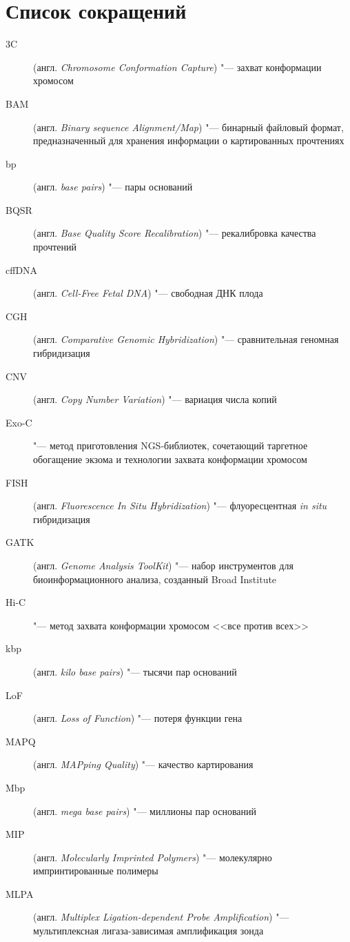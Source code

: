 \documentclass[a4paper,14pt]{extarticle}
\newcommand{\engterm}[1]{англ. \textenglish{\textit{#1}}}
\begin{document}
\tableofcontents
\newpage

\section*{Список сокращений}

\begin{description}
	\item[3C] (\engterm{Chromosome Conformation Capture}) "--- захват конформации хромосом
	\item[BAM] (\engterm{Binary sequence Alignment/Map}) "--- бинарный файловый формат, предназначенный для хранения информации о картированных прочтениях
	\item[bp] (\engterm{base pairs}) "--- пары оснований
	\item[BQSR] (\engterm{Base Quality Score Recalibration}) "--- рекалибровка качества прочтений
	\item[cffDNA] (\engterm{Cell-Free Fetal DNA}) "--- свободная ДНК плода
	\item[CGH] (\engterm{Comparative Genomic Hybridization}) "--- сравнительная геномная гибридизация
	\item[CNV] (\engterm{Copy Number Variation}) "--- вариация числа копий
	\item[Exo-C] "--- метод приготовления NGS\hyp{}библиотек, сочетающий таргетное обогащение экзома и технологии захвата конформации хромосом
	\item[FISH] (\engterm{Fluorescence In Situ Hybridization}) "--- флуоресцентная \textit{in situ} гибридизация
	\item[GATK] (\engterm{Genome Analysis ToolKit}) "--- набор инструментов для биоинформационного анализа, созданный Broad Institute
	\item[Hi-C] "--- метод захвата конформации хромосом <<все против всех>>
	\item[kbp] (\engterm{kilo base pairs}) "--- тысячи пар оснований
	\item[LoF] (\engterm{Loss of Function}) "--- потеря функции гена
	\item[MAPQ] (\engterm{MAPping Quality}) "--- качество картирования
	\item[Mbp] (\engterm{mega base pairs}) "--- миллионы пар оснований
	\item[MIP] (\engterm{Molecularly Imprinted Polymers}) "--- молекулярно импринтированные полимеры
	\item[MLPA] (\engterm{Multiplex Ligation-dependent Probe Amplification}) "--- мультиплексная лигаза-зависимая амплификация зонда

\end{description}
\end{document}
